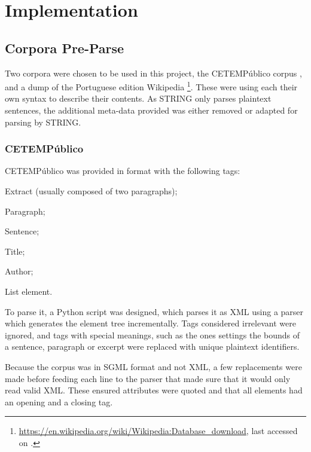 \chapter{Implementation}
\label{sec:implementation}

\section{Corpora Pre-Parse}

Two corpora were chosen to be used in this project, the CETEMPúblico corpus
\cite{rocha2000cetempublico}, and a dump of the Portuguese edition Wikipedia
\footnote{\url{https://en.wikipedia.org/wiki/Wikipedia:Database_download}, last
accessed on .}. These were using each their own syntax to
describe their contents. As \ac{STRING} only parses plaintext sentences, the
additional meta-data provided was either removed or adapted for parsing by
\ac{STRING}.

\subsection{CETEMPúblico}

CETEMPúblico was provided in  format with the following tags:

\begin{description}[labelwidth=3em]
 \item [\texttt{ext}] Extract (usually composed of two paragraphs);
 \item [\texttt{p}]   Paragraph;
 \item [\texttt{s}]   Sentence;
 \item [\texttt{t}]   Title;
 \item [\texttt{a}]   Author;
 \item [\texttt{li}]  List element.
\end{description}

To parse it, a Python script was designed, which parses it as \ac{XML} using a
parser which generates the element tree incrementally. Tags considered
irrelevant were ignored, and tags with special meanings, such as the ones
settings the bounds of a sentence, paragraph or excerpt were replaced with
unique plaintext identifiers.

Because the corpus was in \ac{SGML} format and not \ac{XML}, a few replacements
were made before feeding each line to the parser that made sure that it would
only read valid \ac{XML}. These ensured attributes were quoted and that all
elements had an opening and a closing tag.


